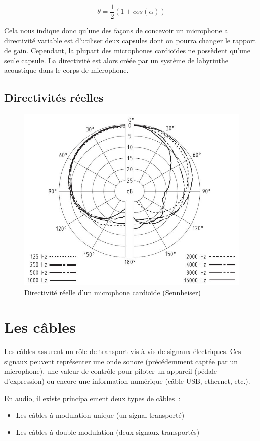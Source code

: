 \documentclass[
]{book}
\providecommand{\tightlist}{%
  \setlength{\itemsep}{0pt}\setlength{\parskip}{0pt}}
\begin{document}
\[ \theta = \frac{1}{2}(1 + cos(\alpha)) \]

Cela nous indique donc qu'une des façons de concevoir un microphone a directivité variable est d'utiliser deux capsules dont on pourra changer le rapport de gain. Cependant, la plupart des microphones cardioïdes ne possèdent qu'une seule capsule. La directivité est alors créée par un système de labyrinthe acoustique dans le corps de microphone.

\hypertarget{directivituxe9s-ruxe9elles}{%
\section{Directivités réelles}\label{directivituxe9s-ruxe9elles}}

\begin{figure}

{\centering \includegraphics[width=0.5\linewidth]{_resources/image_15} 

}

\caption{Directivité réelle d'un microphone cardioïde (Sennheiser)}\label{fig:unnamed-chunk-16}
\end{figure}

\hypertarget{les-cuxe2bles}{%
\chapter{Les câbles}\label{les-cuxe2bles}}

Les câbles assurent un rôle de transport vis-à-vis de signaux électriques. Ces signaux peuvent représenter une onde sonore (précédemment captée par un microphone), une valeur de contrôle pour piloter un appareil (pédale d'expression) ou encore une information numérique (câble USB, ethernet, etc.).

En audio, il existe principalement deux types de câbles~:

\begin{itemize}
\tightlist
\item
  Les câbles à modulation unique (un signal transporté)
\item
  Les câbles à double modulation (deux signaux transportés)
\end{itemize}
\end{document}
